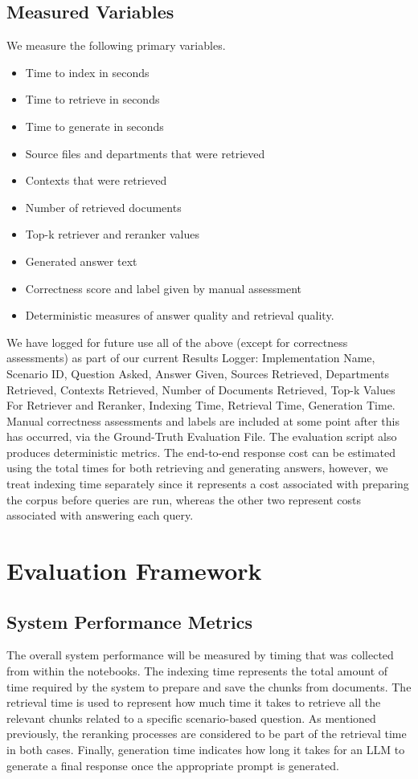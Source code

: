 \subsection{Measured Variables}

We measure the following primary variables.

\begin{itemize} 
    \item Time to index in seconds
    \item Time to retrieve in seconds
    \item Time to generate in seconds
    \item Source files and departments that were retrieved
    \item Contexts that were retrieved
    \item Number of retrieved documents
    \item Top-k retriever and reranker values
    \item Generated answer text
    \item Correctness score and label given by manual assessment
    \item Deterministic measures of answer quality and retrieval quality. 
\end{itemize}

We have logged for future use all of the above (except for correctness assessments) as part of our current Results Logger: Implementation Name, Scenario ID, Question Asked, Answer Given, Sources Retrieved, Departments Retrieved, Contexts Retrieved, Number of Documents Retrieved, Top-k Values For Retriever and Reranker, Indexing Time, Retrieval Time, Generation Time. Manual correctness assessments and labels are included at some point after this has occurred, via the Ground-Truth Evaluation File. The evaluation script also produces deterministic metrics. The end-to-end response cost can be estimated using the total times for both retrieving and generating answers, however, we treat indexing time separately since it represents a cost associated with preparing the corpus before queries are run, whereas the other two represent costs associated with answering each query.

\section{Evaluation Framework}

\subsection{System Performance Metrics}
The overall system performance will be measured by timing that was collected from within the notebooks. The indexing time represents the total amount of time required by the system to prepare and save the chunks from documents. The retrieval time is used to represent how much time it takes to retrieve all the relevant chunks related to a specific scenario-based question. As mentioned previously, the reranking processes are considered to be part of the retrieval time in both cases. Finally, generation time indicates how long it takes for an LLM to generate a final response once the appropriate prompt is generated.

